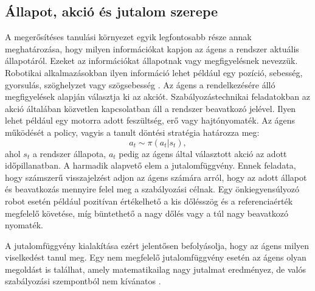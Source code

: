 \documentclass[12pt,a4paper]{report}
\begin{document}
	\subsection{Állapot, akció és jutalom szerepe}
	A megerősítéses tanulási környezet egyik legfontosabb része annak meghatározása, hogy milyen információkat kapjon az ágens a rendszer aktuális állapotáról. Ezeket az információkat állapotnak vagy megfigyelésnek nevezzük. Robotikai alkalmazásokban ilyen információ lehet például egy pozíció, sebesség, gyorsulás, szöghelyzet vagy szögsebesség \cite{kober2013}.
	\newline
	\newline
	Az ágens a rendelkezésére álló megfigyelések alapján választja ki az akciót. Szabályozástechnikai feladatokban az akció általában közvetlen kapcsolatban áll a rendszer beavatkozó jelével. Ilyen lehet például egy motorra adott feszültség, erő vagy hajtónyomaték.
	Az ágens működését a policy, vagyis a tanult döntési stratégia határozza meg:
	\begin{equation}
		a_t \sim \pi(a_t|s_t),
	\end{equation}
	ahol $s_t$ a rendszer állapota, $a_t$ pedig az ágens által választott akció az adott időpillanatban.
	\newline
	\newline
	A harmadik alapvető elem a jutalomfüggvény. Ennek feladata, hogy számszerű visszajelzést adjon az ágens számára arról, hogy az adott állapot és beavatkozás mennyire felel meg a szabályozási célnak. Egy önkiegyensúlyozó robot esetén például pozitívan értékelhető a kis dőlésszög és a referenciaérték megfelelő követése, míg büntethető a nagy dőlés vagy a túl nagy beavatkozó nyomaték.
	
	A jutalomfüggvény kialakítása ezért jelentősen befolyásolja, hogy az ágens milyen viselkedést tanul meg. Egy nem megfelelő jutalomfüggvény esetén az ágens olyan megoldást is találhat, amely matematikailag nagy jutalmat eredményez, de valós szabályozási szempontból nem kívánatos \cite{kober2013}.
\end{document}
